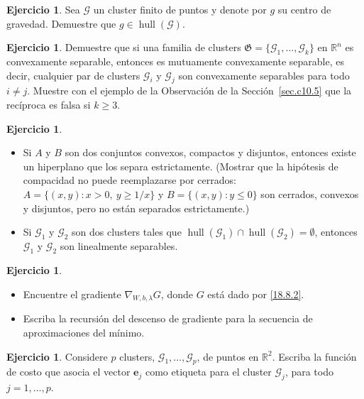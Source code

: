 \documentclass[12pt, a4paper]{amsbook}
\def\hull{\operatorname {\mathrm{hull}}}
\newcommand{\R}{{\mathbb R}}
\newcommand{\G}{{\mathcal G}}
\newcommand{\ee}{{\mathbf e}}
\newcommand{\Gk}{{\mathfrak G}}
\theoremstyle{remark}
\theoremstyle{definition}
\newtheorem{ejer}[teo]{Ejercicio}
\numberwithin{section}{chapter}
\numberwithin{subsection}{section}
\numberwithin{equation}{section}
\numberwithin{figure}{chapter}
\begin{document}
\begin{ejer}
Sea $\G$ un cluster finito de puntos y denote por $g$ su centro de gravedad. Demuestre que $g \in \hull(\G)$.
\end{ejer}

\begin{ejer}
Demuestre que si una familia de clusters $\Gk = \{\G_1, \dots, \G_k\}$ en $\R^n$ es convexamente separable, entonces es mutuamente convexamente separable, es decir, cualquier par de clusters $\G_i$ y $\G_j$ son convexamente separables para todo $i \neq j$. Muestre con el ejemplo de la Observación de la Sección~\ref{sec.c10.5} que la recíproca es falsa si $k\ge3$.
\end{ejer}

\begin{ejer}\label{18.11.9}
\begin{itemize}
\item[(a)] Si $A$ y $B$ son dos conjuntos convexos, compactos y disjuntos, entonces existe un hiperplano que los separa estrictamente. (Mostrar que la hipótesis de compacidad no puede reemplazarse por cerrados: $A=\{(x,y)\colon x>0,\ y\ge1/x\}$ y $B=\{(x,y)\colon y\le0\}$ son cerrados, convexos y disjuntos, pero no están separados estrictamente.)
\item[(b)] Si $\G_1$ y $\G_2$ son dos clusters tales que $\hull(\G_1) \cap \hull(\G_2) = \emptyset$, entonces $\G_1$ y $\G_2$ son linealmente separables.
\end{itemize}
\end{ejer}

\begin{ejer}\label{18.11.10}
\begin{itemize}
\item[(a)] Encuentre el gradiente $\nabla_{W,b,\lambda} G$, donde $G$ está dado por \eqref{18.8.2}.
\item[(b)] Escriba la recursión del descenso de gradiente para la secuencia de aproximaciones del mínimo.
\end{itemize}
\end{ejer}

\begin{ejer}\label{18.11.11}
Considere $p$ clusters, $\G_1, \dots, \G_p$, de puntos en $\R^2$. Escriba la función de costo que asocia el vector $\ee_j$ como etiqueta para el cluster $\G_j$, para todo $j = 1, \dots, p$.
\end{ejer}




\end{document}
